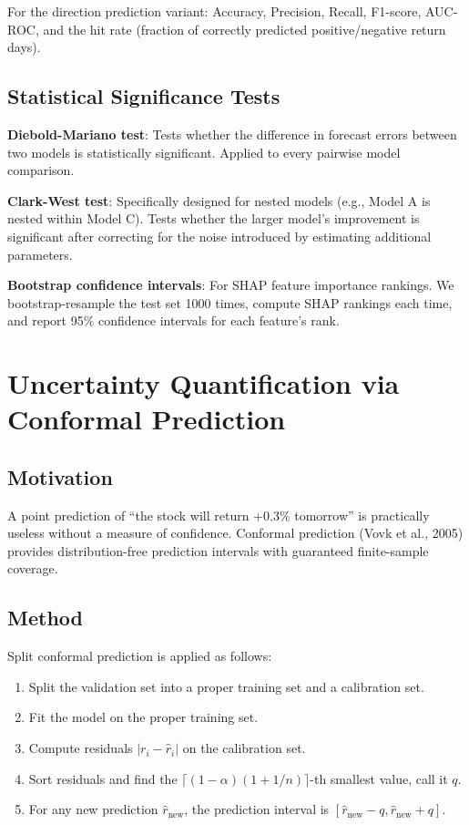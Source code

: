 \documentclass[11pt,a4paper]{article}
\begin{document}
For the direction prediction variant: Accuracy, Precision, Recall, F1-score, AUC-ROC, and the hit rate (fraction of correctly predicted positive/negative return days).

\subsection{Statistical Significance Tests}

\textbf{Diebold-Mariano test}: Tests whether the difference in forecast errors between two models is statistically significant. Applied to every pairwise model comparison.

\textbf{Clark-West test}: Specifically designed for nested models (e.g., Model A is nested within Model C). Tests whether the larger model's improvement is significant after correcting for the noise introduced by estimating additional parameters.

\textbf{Bootstrap confidence intervals}: For SHAP feature importance rankings. We bootstrap-resample the test set 1000 times, compute SHAP rankings each time, and report 95\% confidence intervals for each feature's rank.


\section{Uncertainty Quantification via Conformal Prediction}

\subsection{Motivation}

A point prediction of ``the stock will return +0.3\% tomorrow'' is practically useless without a measure of confidence. Conformal prediction (Vovk et al., 2005) provides distribution-free prediction intervals with guaranteed finite-sample coverage.

\subsection{Method}

Split conformal prediction is applied as follows:

\begin{enumerate}[nosep]
    \item Split the validation set into a proper training set and a calibration set.
    \item Fit the model on the proper training set.
    \item Compute residuals $|r_i - \hat{r}_i|$ on the calibration set.
    \item Sort residuals and find the $\lceil (1-\alpha)(1 + 1/n) \rceil$-th smallest value, call it $q$.
    \item For any new prediction $\hat{r}_{\text{new}}$, the prediction interval is $[\hat{r}_{\text{new}} - q, \hat{r}_{\text{new}} + q]$.
\end{enumerate}
\end{document}
